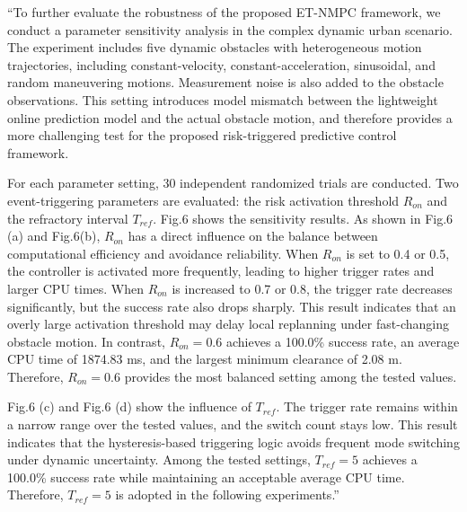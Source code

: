 \documentclass[12pt, twosides]{article}
\theoremstyle{definition}
\begin{document}
``To further evaluate the robustness of the proposed ET-NMPC framework, we conduct a parameter sensitivity analysis in the complex dynamic urban scenario. The experiment includes five dynamic obstacles with heterogeneous motion trajectories, including constant-velocity, constant-acceleration, sinusoidal, and random maneuvering motions. Measurement noise is also added to the obstacle observations. This setting introduces model mismatch between the lightweight online prediction model and the actual obstacle motion, and therefore provides a more challenging test for the proposed risk-triggered predictive control framework.

For each parameter setting, 30 independent randomized trials are conducted. Two event-triggering parameters are evaluated: the risk activation threshold $R_{on}$ and the refractory interval $T_{ref}$. Fig.6 shows the sensitivity results. As shown in Fig.6 (a) and Fig.6(b), $R_{on}$ has a direct influence on the balance between computational efficiency and avoidance reliability. When $R_{on}$ is set to 0.4 or 0.5, the controller is activated more frequently, leading to higher trigger rates and larger CPU times. When $R_{on}$ is increased to 0.7 or 0.8, the trigger rate decreases significantly, but the success rate also drops sharply. This result indicates that an overly large activation threshold may delay local replanning under fast-changing obstacle motion. In contrast, $R_{on}=0.6$ achieves a 100.0\% success rate, an average CPU time of 1874.83 ms, and the largest minimum clearance of 2.08 m. Therefore, $R_{on}=0.6$ provides the most balanced setting among the tested values.

Fig.6 (c) and Fig.6 (d) show the influence of $T_{ref}$. The trigger rate remains within a narrow range over the tested values, and the switch count stays low. This result indicates that the hysteresis-based triggering logic avoids frequent mode switching under dynamic uncertainty. Among the tested settings, $T_{ref}=5$ achieves a 100.0\% success rate while maintaining an acceptable average CPU time. Therefore, $T_{ref}=5$ is adopted in the following experiments.'' 
\end{document}
